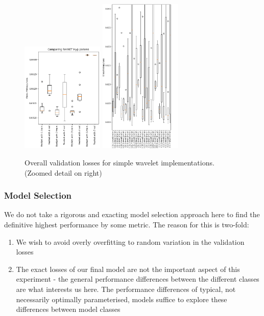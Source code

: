 \documentclass[9pt,conference]{IEEEtran}
\begin{document}
\begin{figure}
    \centering
    \includegraphics[width=0.35\textwidth]{resnetParams.png}
    \includegraphics[width=0.35\textwidth]{waveletParamLossesDetail.png}
    \caption{Overall validation losses for simple wavelet implementations. (Zoomed detail on right)}
\end{figure}

\clearpage


\subsubsection{Model Selection}

We do not take a rigorous and exacting model selection approach here to find the definitive highest performance by some metric. The reason for this is two-fold:

\begin{enumerate}
    \item We wish to avoid overly overfitting to random variation in the validation losses
    \item The exact losses of our final model are not the important aspect of this experiment - the general performance differences between the different classes are what interests us here. The performance differences of typical, not necessarily optimally parameterised, models suffice to explore these differences between model classes
\end{enumerate}
\end{document}
